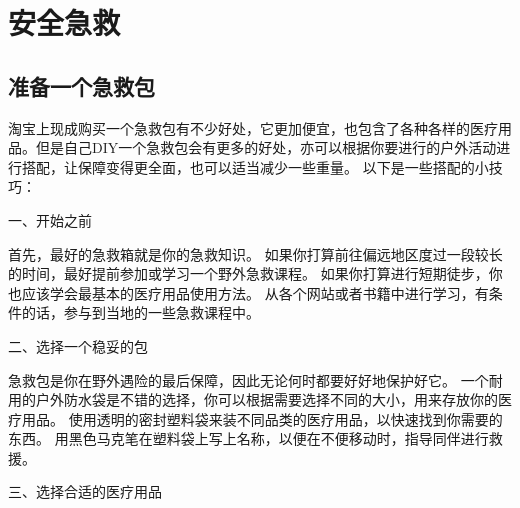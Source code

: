 \documentclass[UTF8]{ctexbook}
\begin{document}
\section{安全急救}
\subsection{准备一个急救包}
淘宝上现成购买一个急救包有不少好处，它更加便宜，也包含了各种各样的医疗用品。但是自己DIY一个急救包会有更多的好处，亦可以根据你要进行的户外活动进行搭配，让保障变得更全面，也可以适当减少一些重量。
以下是一些搭配的小技巧：

一、开始之前

首先，最好的急救箱就是你的急救知识。
如果你打算前往偏远地区度过一段较长的时间，最好提前参加或学习一个野外急救课程。
如果你打算进行短期徒步，你也应该学会最基本的医疗用品使用方法。
从各个网站或者书籍中进行学习，有条件的话，参与到当地的一些急救课程中。

二、选择一个稳妥的包

急救包是你在野外遇险的最后保障，因此无论何时都要好好地保护好它。
一个耐用的户外防水袋是不错的选择，你可以根据需要选择不同的大小，用来存放你的医疗用品。
使用透明的密封塑料袋来装不同品类的医疗用品，以快速找到你需要的东西。
用黑色马克笔在塑料袋上写上名称，以便在不便移动时，指导同伴进行救援。

三、选择合适的医疗用品
\end{document}
